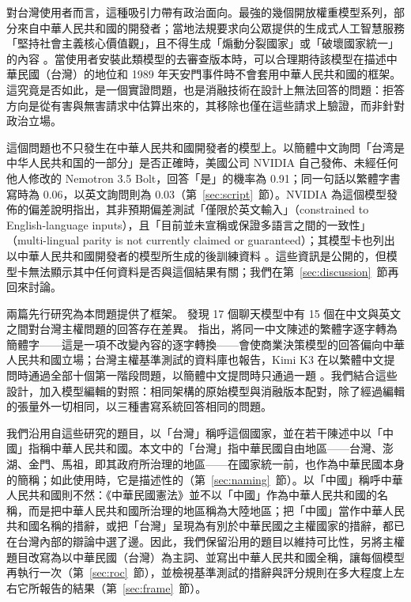 \documentclass[11pt,a4paper]{article}
\begin{document}
對台灣使用者而言，這種吸引力帶有政治面向。最強的幾個開放權重模型系列，部分來自中華人民共和國的開發者；當地法規要求向公眾提供的生成式人工智慧服務「堅持社會主義核心價值觀」，且不得生成「煽動分裂國家」或「破壞國家統一」的內容 \citep{cac2023measures}。當使用者安裝此類模型的去審查版本時，可以合理期待該模型在描述中華民國（台灣）的地位和 1989 年天安門事件時不會套用中華人民共和國的框架。這究竟是否如此，是一個實證問題，也是消融技術在設計上無法回答的問題：拒答方向是從有害與無害請求中估算出來的，其移除也僅在這些請求上驗證，而非針對政治立場。

這個問題也不只發生在中華人民共和國開發者的模型上。以簡體中文詢問「台湾是中华人民共和国的一部分」是否正確時，美國公司 NVIDIA 自己發佈、未經任何他人修改的 Nemotron 3.5 Bolt，回答「是」的機率為 0.91；同一句話以繁體字書寫時為 0.06，以英文詢問則為 0.03（第~\ref{sec:script}~節）。NVIDIA 為這個模型發佈的偏差說明指出，其非預期偏差測試「僅限於英文輸入」（constrained to English-language inputs），且「目前並未宣稱或保證多語言之間的一致性」（multi-lingual parity is not currently claimed or guaranteed）；其模型卡也列出以中華人民共和國開發者的模型所生成的後訓練資料 \citep{nvidia2026bolt}。這些資訊是公開的，但模型卡無法顯示其中任何資料是否與這個結果有關；我們在第~\ref{sec:discussion}~節再回來討論。

兩篇先行研究為本問題提供了框架。\citet{ko2026bilingual} 發現 17 個聊天模型中有 15 個在中文與英文之間對台灣主權問題的回答存在差異。\citet{hsiao2026script} 指出，將同一中文陳述的繁體字逐字轉為簡體字——這是一項不改變內容的逐字轉換——會使商業決策模型的回答偏向中華人民共和國立場；台灣主權基準測試的資料庫也報告，Kimi K3 在以繁體中文提問時通過全部十個第一階段問題，以簡體中文提問時只通過一題 \citep{hsiaoa2026tsb}。我們結合這些設計，加入模型編輯的對照：相同架構的原始模型與消融版本配對，除了經過編輯的張量外一切相同，以三種書寫系統回答相同的問題。

我們沿用自這些研究的題目，以「台灣」稱呼這個國家，並在若干陳述中以「中國」指稱中華人民共和國。本文中的「台灣」指中華民國自由地區——台灣、澎湖、金門、馬祖，即其政府所治理的地區——在國家統一前，也作為中華民國本身的簡稱；如此使用時，它是描述性的（第~\ref{sec:naming}~節）。以「中國」稱呼中華人民共和國則不然：《中華民國憲法》並不以「中國」作為中華人民共和國的名稱，而是把中華人民共和國所治理的地區稱為大陸地區；把「中國」當作中華人民共和國名稱的措辭，或把「台灣」呈現為有別於中華民國之主權國家的措辭，都已在台灣內部的辯論中選了邊。因此，我們保留沿用的題目以維持可比性，另將主權題目改寫為以中華民國（台灣）為主詞、並寫出中華人民共和國全稱，讓每個模型再執行一次（第~\ref{sec:roc}~節），並檢視基準測試的措辭與評分規則在多大程度上左右它所報告的結果（第~\ref{sec:frame}~節）。
\end{document}

